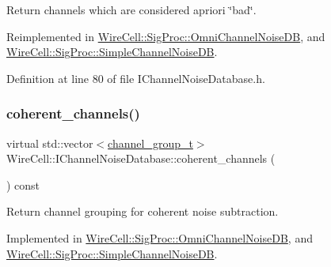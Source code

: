 Return channels which are considered a\textquotesingle{}priori \char`\"{}bad\char`\"{}. 



Reimplemented in \hyperlink{class_wire_cell_1_1_sig_proc_1_1_omni_channel_noise_d_b_a04ee13cfae6285a0c0ac160a259fb2b5}{Wire\+Cell\+::\+Sig\+Proc\+::\+Omni\+Channel\+Noise\+DB}, and \hyperlink{class_wire_cell_1_1_sig_proc_1_1_simple_channel_noise_d_b_abc31faca2ae9ee69ebfd01b9edd36289}{Wire\+Cell\+::\+Sig\+Proc\+::\+Simple\+Channel\+Noise\+DB}.



Definition at line 80 of file I\+Channel\+Noise\+Database.\+h.

\mbox{\label{class_wire_cell_1_1_i_channel_noise_database_a0f220478d9d7ed3c913b925e84b39138}} 
\subsubsection{\texorpdfstring{coherent\+\_\+channels()}{coherent\_channels()}}
{\footnotesize\ttfamily virtual std\+::vector$<$\hyperlink{class_wire_cell_1_1_i_channel_noise_database_a7fedd6ab67ba4e7eeb8cf182cc9dc6b1}{channel\+\_\+group\+\_\+t}$>$ Wire\+Cell\+::\+I\+Channel\+Noise\+Database\+::coherent\+\_\+channels (\begin{DoxyParamCaption}{ }\end{DoxyParamCaption}) const\hspace{0.3cm}{\ttfamily [pure virtual]}}



Return channel grouping for coherent noise subtraction. 



Implemented in \hyperlink{class_wire_cell_1_1_sig_proc_1_1_omni_channel_noise_d_b_a8cdff2a7435fc85ff77b234a88aaaece}{Wire\+Cell\+::\+Sig\+Proc\+::\+Omni\+Channel\+Noise\+DB}, and \hyperlink{class_wire_cell_1_1_sig_proc_1_1_simple_channel_noise_d_b_a157979de597ebfcf99238544ffd82c0e}{Wire\+Cell\+::\+Sig\+Proc\+::\+Simple\+Channel\+Noise\+DB}.

\mbox{\label{class_wire_cell_1_1_i_channel_noise_database_ac75b3b6b0c7368c0c87d907012abaf9d}} 
